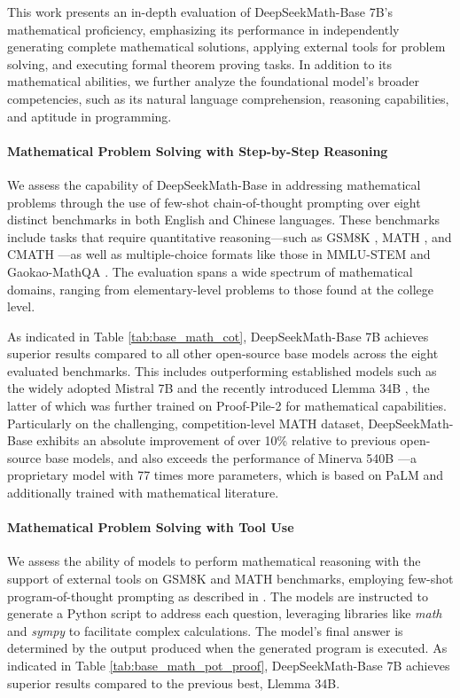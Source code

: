 \begin{itemize}[topsep=0pt]
This work presents an in-depth evaluation of DeepSeekMath-Base 7B’s mathematical proficiency, emphasizing its performance in independently generating complete mathematical solutions, applying external tools for problem solving, and executing formal theorem proving tasks. In addition to its mathematical abilities, we further analyze the foundational model’s broader competencies, such as its natural language comprehension, reasoning capabilities, and aptitude in programming.

\paragraph{Mathematical Problem Solving with Step-by-Step Reasoning}

We assess the capability of DeepSeekMath-Base in addressing mathematical problems through the use of few-shot chain-of-thought prompting \citep{cot} over eight distinct benchmarks in both English and Chinese languages. These benchmarks include tasks that require quantitative reasoning—such as GSM8K \citep{gsm8k}, MATH \citep{MATH}, and CMATH \citep{wei2023cmath}—as well as multiple-choice formats like those in MMLU-STEM \citep{mmlu} and Gaokao-MathQA \citep{agieval}. The evaluation spans a wide spectrum of mathematical domains, ranging from elementary-level problems to those found at the college level.

As indicated in Table \ref{tab:base_math_cot}, DeepSeekMath-Base 7B achieves superior results compared to all other open-source base models across the eight evaluated benchmarks. This includes outperforming established models such as the widely adopted Mistral 7B \citep{mistral} and the recently introduced Llemma 34B \citep{llemma}, the latter of which was further trained on Proof-Pile-2 \citep{llemma} for mathematical capabilities. Particularly on the challenging, competition-level MATH dataset, DeepSeekMath-Base exhibits an absolute improvement of over 10\% relative to previous open-source base models, and also exceeds the performance of Minerva 540B \citep{minerva}—a proprietary model with 77 times more parameters, which is based on PaLM \citep{palm} and additionally trained with mathematical literature.

\paragraph{Mathematical Problem Solving with Tool Use} We assess the ability of models to perform mathematical reasoning with the support of external tools on GSM8K and MATH benchmarks, employing few-shot program-of-thought prompting as described in \citep{pot,pal}. The models are instructed to generate a Python script to address each question, leveraging libraries like \textit{math} and \textit{sympy} to facilitate complex calculations. The model’s final answer is determined by the output produced when the generated program is executed. As indicated in Table \ref{tab:base_math_pot_proof}, DeepSeekMath-Base 7B achieves superior results compared to the previous best, Llemma 34B.


\end{itemize}
